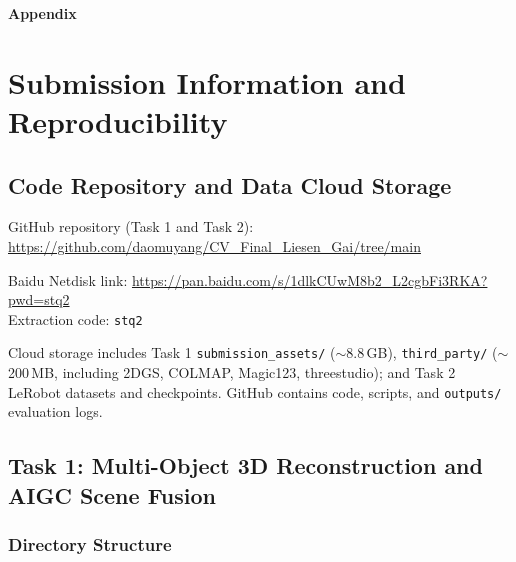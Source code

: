 \documentclass[10pt,twocolumn,letterpaper]{article}
\begin{document}
\clearpage
\appendix
\renewcommand{\appendixname}{Appendix}
\renewcommand{\thesection}{\Alph{section}}
\begin{center}
  {\Large\bfseries Appendix}
\end{center}
\vspace{0.6em}
\section{Submission Information and Reproducibility}

\subsection{Code Repository and Data Cloud Storage}

GitHub repository (Task 1 and Task 2): \url{https://github.com/daomuyang/CV_Final_Liesen_Gai/tree/main}

Baidu Netdisk link: \url{https://pan.baidu.com/s/1dlkCUwM8b2_L2cgbFi3RKA?pwd=stq2}\\
Extraction code: \texttt{stq2}

Cloud storage includes Task 1 \texttt{submission\_assets/} ($\sim$8.8\,GB), \texttt{third\_party/} ($\sim$200\,MB, including 2DGS, COLMAP, Magic123, threestudio); and Task 2 LeRobot datasets and checkpoints. GitHub contains code, scripts, and \texttt{outputs/} evaluation logs.

\subsection{Task 1: Multi-Object 3D Reconstruction and AIGC Scene Fusion}
\label{sec:t1-repro}

\subsubsection{Directory Structure}
\end{document}
